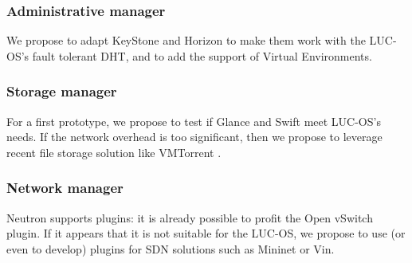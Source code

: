 \subsubsection{Administrative manager}
We propose to adapt KeyStone and Horizon to make them work with the LUC-OS's
fault tolerant DHT, and to add the support of Virtual Environments.

\subsubsection{Storage manager}
For a first prototype, we propose to test if Glance and Swift meet LUC-OS's 
needs. If the network overhead is too significant, then we propose to leverage 
recent file storage solution like VMTorrent \cite{reich:2012}.

\subsubsection{Network manager}
Neutron supports plugins: it is already possible to profit the Open vSwitch 
plugin. If it appears that it is not suitable for the LUC-OS, we propose to use
(or even to develop) plugins for SDN solutions such as Mininet or Vin.



